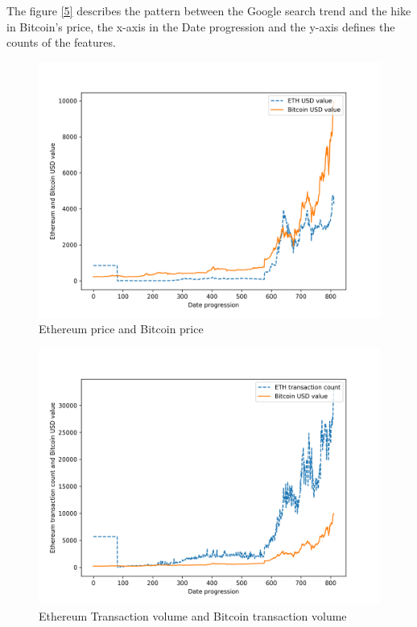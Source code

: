 \documentclass[sigconf]{acmart}
\begin{document}
The figure \ref{5} describes the pattern between the Google search trend and the hike in Bitcoin's price, the x-axis in the Date progression and the y-axis defines the counts of the features. 

\begin{figure}[!ht]
  \centering\includegraphics[width=\columnwidth]{images/ethvalue.png}
  \caption{Ethereum price and Bitcoin price}
  \label{6}
\end{figure}

\begin{figure}[!ht]
  \centering\includegraphics[width=\columnwidth]{images/ethtrancount.png}
  \caption{Ethereum Transaction volume and Bitcoin transaction volume}
  \label{7}
\end{figure}
\end{document}
